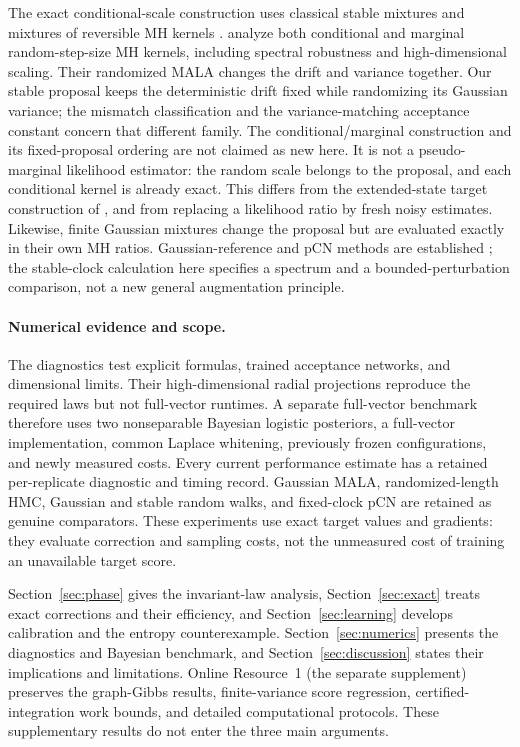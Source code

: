 \documentclass[pdflatex,iicol,sn-mathphys-ay]{sn-jnl}
\theoremstyle{definition}\newtheorem{definition}[theorem]{Definition}
\theoremstyle{remark}\newtheorem{remark}[theorem]{Remark}
\numberwithin{equation}{section}
\newcommand{\1}{\mathbf 1}
\begin{document}
The exact conditional-scale construction uses classical stable mixtures and mixtures of reversible MH kernels \citep{kanter,tierney}. \citet{grazzi} analyze both conditional and marginal random-step-size MH kernels, including spectral robustness and high-dimensional scaling. Their randomized MALA changes the drift and variance together. Our stable proposal keeps the deterministic drift fixed while randomizing its Gaussian variance; the mismatch classification and the variance-matching acceptance constant concern that different family. The conditional/marginal construction and its fixed-proposal ordering are not claimed as new here. It is not a pseudo-marginal likelihood estimator: the random scale belongs to the proposal, and each conditional kernel is already exact. This differs from the extended-state target construction of \citet{andrieu}, and from replacing a likelihood ratio by fresh noisy estimates. Likewise, finite Gaussian mixtures change the proposal but are evaluated exactly in their own MH ratios. Gaussian-reference and pCN methods are established \citep{cotter,hairer}; the stable-clock calculation here specifies a spectrum and a bounded-perturbation comparison, not a new general augmentation principle.

\paragraph{Numerical evidence and scope.}
The diagnostics test explicit formulas, trained acceptance networks, and dimensional limits. Their high-dimensional radial projections reproduce the required laws but not full-vector runtimes. A separate full-vector benchmark therefore uses two nonseparable Bayesian logistic posteriors, a full-vector implementation, common Laplace whitening, previously frozen configurations, and newly measured costs. Every current performance estimate has a retained per-replicate diagnostic and timing record. Gaussian MALA, randomized-length HMC, Gaussian and stable random walks, and fixed-clock pCN are retained as genuine comparators. These experiments use exact target values and gradients: they evaluate correction and sampling costs, not the unmeasured cost of training an unavailable target score.

Section~\ref{sec:phase} gives the invariant-law analysis, Section~\ref{sec:exact} treats exact corrections and their efficiency, and Section~\ref{sec:learning} develops calibration and the entropy counterexample. Section~\ref{sec:numerics} presents the diagnostics and Bayesian benchmark, and Section~\ref{sec:discussion} states their implications and limitations. Online Resource~1 (the separate supplement) preserves the graph-Gibbs results, finite-variance score regression, certified-integration work bounds, and detailed computational protocols. These supplementary results do not enter the three main arguments.
\end{document}
